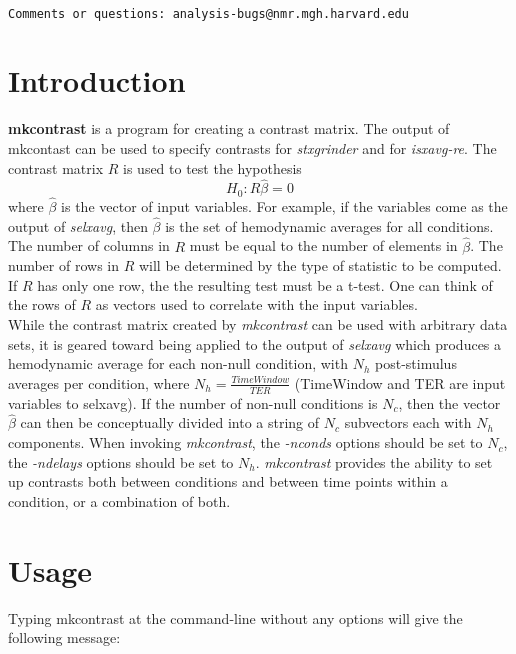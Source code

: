 \documentclass[10pt]{article}
\begin{document}
\begin{Large}
 \\
\end{Large}

\noindent 
\begin{verbatim}
Comments or questions: analysis-bugs@nmr.mgh.harvard.edu
\end{verbatim}

\section{Introduction}

{\bf mkcontrast} is a program for creating a contrast matrix. The
output of mkcontast can be used to specify contrasts for {\em
stxgrinder} and for {\em isxavg-re}. The contrast matrix $R$ is used
to test the hypothesis
\begin{equation}
H_0: R \hat{\beta} = 0
\end{equation}
where $\hat{\beta}$ is the vector of input variables.  For example, if
the variables come as the output of {\em selxavg}, then $\hat{\beta}$
is the set of hemodynamic averages for all conditions.  The number of
columns in $R$ must be equal to the number of elements in
$\hat{\beta}$. The number of rows in $R$ will be determined by the
type of statistic to be computed.  If $R$ has only one row, the the
resulting test must be a t-test.  One can think of the rows of $R$ as
vectors used to correlate with the input variables.\\

While the contrast matrix created by {\em mkcontrast} can be used with
arbitrary data sets, it is geared toward being applied to the output
of {\em selxavg} which produces a hemodynamic average for each
non-null condition, with $N_h$ post-stimulus averages per condition,
where $N_h = \frac{TimeWindow}{TER}$ (TimeWindow and TER are input
variables to selxavg).  If the number of non-null conditions is $N_c$,
then the vector $\hat{\beta}$ can then be conceptually divided into a
string of $N_c$ subvectors each with $N_h$ components.  When invoking
{\em mkcontrast}, the {\em -nconds} options should be set to $N_c$,
the {\em -ndelays} options should be set to $N_h$. {\em mkcontrast}
provides the ability to set up contrasts both between conditions and
between time points within a condition, or a combination of both.\\

\section{Usage}
Typing mkcontrast at the command-line without any options will give the
following message:\\ 
\end{document}
